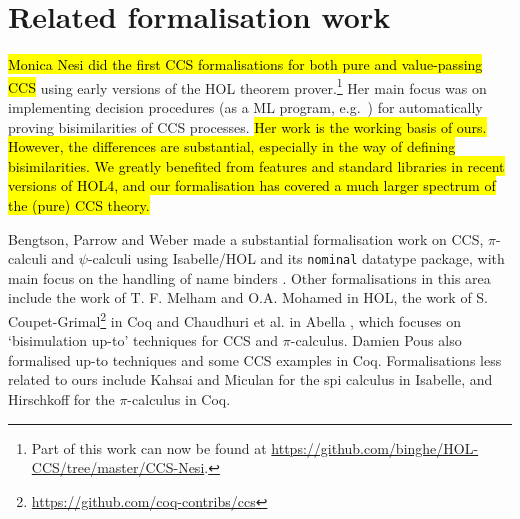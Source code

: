 \section{Related formalisation work}
\label{s:rel}

\hl{Monica Nesi did the first CCS formalisations for both pure and
value-passing CCS} \cite{Nesi:1992ve,Nesi:2017wo} using early versions of the HOL
theorem prover.\footnote{Part of this work can now be found at
  \url{https://github.com/binghe/HOL-CCS/tree/master/CCS-Nesi}.}
Her main focus was on implementing decision procedures (as a ML
program, e.g.~\cite{cleaveland1993concurrency}) for
automatically proving bisimilarities of CCS
processes. %
\hl{Her work is
  the working basis of ours. However, the differences are substantial, especially in the way of defining
bisimilarities. We greatly benefited from features and standard
libraries in recent versions of HOL4, and our formalisation has
covered a much larger spectrum of the (pure) CCS theory.}

Bengtson,  Parrow and Weber
made a substantial formalisation work 
on CCS, $\pi$-calculi
and $\psi$-calculi 
using Isabelle/HOL and its \texttt{nominal} datatype package, with main focus on the handling of
name binders \cite{bengtson2010formalising,bengtson2007completeness,parrow2009formalising}.
%
Other formalisations in this area include the work of T. F. Melham
\cite{melham1994mechanized} and O.A. Mohamed
\cite{mohamed1995mechanizing} in HOL,
the work of S. Coupet-Grimal\footnote{\url{https://github.com/coq-contribs/ccs}} in Coq
and Chaudhuri et al.\;\cite{chaudhuri2015lightweight} in Abella
, which
focuses on `bisimulation up-to' techniques %
for CCS and $\pi$-calculus.
Damien Pous also formalised up-to techniques and some CCS examples in
Coq. \cite{pous2007new}
Formalisations less related to ours
include Kahsai and Miculan \cite{kahsai2008implementing} for the spi
calculus  in Isabelle, and Hirschkoff \cite{hirschkoff1997full} for the $\pi$-calculus in Coq.
